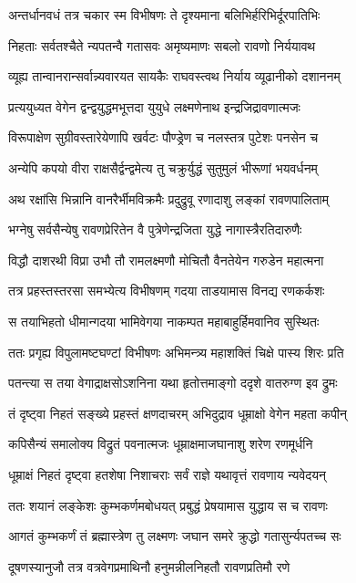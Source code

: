 \twolineshloka
{अन्तर्धानवधं तत्र चकार स्म विभीषणः}
{ते दृश्यमाना बलिभिर्हरिभिर्दूरपातिभिः}%

\twolineshloka
{निहताः सर्वतश्चैते न्यपतन्वै गतासवः}
{अमृष्यमाणः सबलो रावणो निर्ययावथ}%

\twolineshloka
{व्यूह्य तान्वानरान्सर्वान्न्यवारयत सायकैः}
{राघवस्त्वथ निर्याय व्यूढानीको दशाननम्}%

\twolineshloka
{प्रत्ययुध्यत वेगेन द्वन्द्वयुद्धमभूत्तदा}
{युयुधे लक्ष्मणेनाथ इन्द्रजिद्रावणात्मजः}%

\twolineshloka
{विरूपाक्षेण सुग्रीवस्तारेयेणापि खर्वटः}
{पौण्ड्रेण च नलस्तत्र पुटेशः पनसेन च}%

\twolineshloka
{अन्येपि कपयो वीरा राक्षसैर्द्वन्द्वमेत्य तु}
{चक्रुर्युद्धं सुतुमुलं भीरूणां भयवर्धनम्}%

\twolineshloka
{अथ रक्षांसि भिन्नानि वानरैर्भीमविक्रमैः}
{प्रदुद्रुवू रणादाशु लङ्कां रावणपालिताम्}%

\twolineshloka
{भग्नेषु सर्वसैन्येषु रावणप्रेरितेन वै}
{पुत्रेणेन्द्रजिता युद्धे नागास्त्रैरतिदारुणैः}%

\twolineshloka
{विद्धौ दाशरथी विप्रा उभौ तौ रामलक्ष्मणौ}
{मोचितौ वैनतेयेन गरुडेन महात्मना}%

\twolineshloka
{तत्र प्रहस्तस्तरसा समभ्येत्य विभीषणम्}
{गदया ताडयामास विनद्य रणकर्कशः}%

\twolineshloka
{स तयाभिहतो धीमान्गदया भामिवेगया}
{नाकम्पत महाबाहुर्हिमवानिव सुस्थितः}%

\twolineshloka
{ततः प्रगृह्य विपुलामष्टघण्टां विभीषणः}
{अभिमन्त्र्य महाशक्तिं चिक्षे पास्य शिरः प्रति}%

\twolineshloka
{पतन्त्या स तया वेगाद्राक्षसोऽशनिना यथा}
{हृतोत्तमाङ्गो ददृशे वातरुग्ण इव द्रुमः}%

\twolineshloka
{तं दृष्ट्वा निहतं सङ्ख्ये प्रहस्तं क्षणदाचरम्}
{अभिदुद्राव धूम्राक्षो वेगेन महता कपीन्}%

\twolineshloka
{कपिसैन्यं समालोक्य विद्रुतं पवनात्मजः}
{धूम्राक्षमाजघानाशु शरेण रणमूर्धनि}%

\twolineshloka
{धूम्राक्षं निहतं दृष्ट्वा हतशेषा निशाचराः}
{सर्वं राज्ञे यथावृत्तं रावणाय न्यवेदयन्}%

\twolineshloka
{ततः शयानं लङ्केशः कुम्भकर्णमबोधयत्}
{प्रबुद्धं प्रेषयामास युद्धाय स च रावणः}%

\twolineshloka
{आगतं कुम्भकर्णं तं ब्रह्मास्त्रेण तु लक्ष्मणः}
{जघान समरे क्रुद्धो गतासुर्न्यपतच्च सः}%

\twolineshloka
{दूषणस्यानुजौ तत्र वत्रवेगप्रमाथिनौ}
{हनुमन्नीलनिहतौ रावणप्रतिमौ रणे}%

